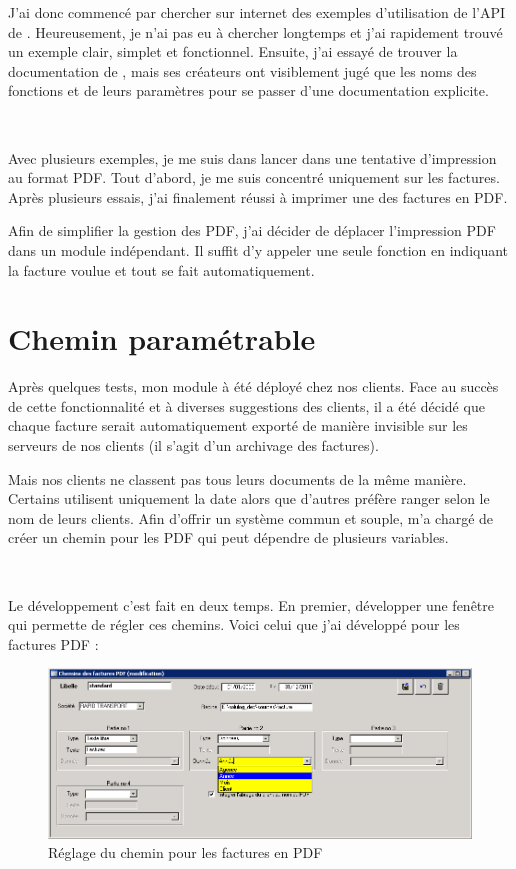 J'ai donc commencé par chercher sur internet des exemples d'utilisation de l'API de \pdfcreator. Heureusement, je n'ai pas eu à chercher longtemps et j'ai rapidement trouvé un exemple clair, simplet et fonctionnel. Ensuite, j'ai essayé de trouver la documentation de \pdfcreator, mais ses créateurs ont visiblement jugé que les noms des fonctions et de leurs paramètres pour se passer d'une documentation explicite.

~

Avec plusieurs exemples, je me suis dans lancer dans une tentative d'impression au format PDF. Tout d'abord, je me suis concentré uniquement sur les factures. Après plusieurs essais, j'ai finalement réussi à imprimer une des factures en PDF.

Afin de simplifier la gestion des PDF, j'ai décider de déplacer l'impression PDF dans un module indépendant. Il suffit d'y appeler une seule fonction en indiquant la facture voulue et tout se fait automatiquement.

\section{Chemin paramétrable}
Après quelques tests, mon module à été déployé chez nos clients. Face au succès de cette fonctionnalité et à diverses suggestions des clients, il a été décidé que chaque facture serait automatiquement exporté de manière invisible sur les serveurs de nos clients (il s'agit d'un archivage des factures).

Mais nos clients ne classent pas tous leurs documents de la même manière. Certains utilisent uniquement la date alors que d'autres préfère ranger selon le nom de leurs clients. Afin d'offrir un système commun et souple, \solulog{} m'a chargé de créer un chemin pour les PDF qui peut dépendre de plusieurs variables.

~

Le développement c'est fait en deux temps. En premier, développer une fenêtre qui permette de régler ces chemins. Voici celui que j'ai développé pour les factures PDF :
\begin{figure}[h!]
	\begin{center}
		\includegraphics[scale=.78]{Contenu/Synthese_SeptembreAvril/Images/Chemin_PDF.png}
	\end{center}

	\caption{Réglage du chemin pour les factures en PDF}
	\label{segment_NAD_CA}
\end{figure}

